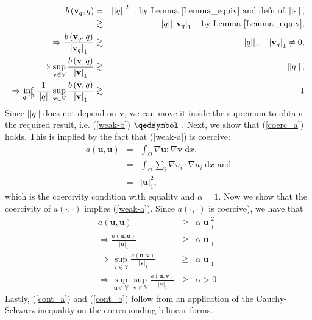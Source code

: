 \documentclass[12pt,a4paper]{article}
\theoremstyle{definition}
\begin{document}
\begin{eqnarray}
b\left(\textbf{v}_q,q\right) &=& \left|\left|q\right|\right|^2 \quad\text{by Lemma \ref{Lemma_equiv}  and defn of } \left|\left|\cdot\right|\right|,\\
&\gtrsim& \left|\left|q\right|\right| \left|\textbf{v}_q\right|_1\quad \text{by Lemma \ref{Lemma_equiv}},\\
\Rightarrow\frac{b\left(\textbf{v}_q,q\right)}{\left|\textbf{v}_q\right|_1} &\gtrsim& \left|\left|q\right|\right|,\quad \left|\textbf{v}_q\right|_1\neq 0,\\
\Rightarrow \sup_{\textbf{v}\in \mathbb{V}}\frac{b\left(\textbf{v},q\right)}{\left|\textbf{v}\right|_1} &\gtrsim& \left|\left|q\right|\right|,\\
\Rightarrow \inf_{q\in \mathbb{P}}\frac{1}{\left|\left|q\right|\right|}\sup_{\textbf{v}\in \mathbb{V}}\frac{b\left(\textbf{v},q\right)}{\left|\textbf{v}\right|_1} &\gtrsim& 1
\end{eqnarray}
Since $\left|\left|q\right|\right|$ does not depend on $\textbf{v}$, we can move it inside the supremum to obtain the required result, i.e. (\ref{weak-b}) $\qedsymbol$ .  Next, we show that (\ref{coerc_a}) holds.  This is implied by the fact that (\ref{weak-a}) is coercive:
\begin{eqnarray}
		a\left(\textbf{u},\textbf{u}\right)&=&\int_{\Omega}\nabla \textbf{u} : \nabla \textbf{v}\;\mathrm{d}x,\nonumber\\
		&=&\int_{\Omega}\sum_{i}\nabla u_i \cdot \nabla u_i\;\mathrm{d}x\text{ and}\nonumber\\
		&=&\left|\textbf{u}\right|_1^2,\nonumber
\end{eqnarray}
which is the coercivity condition with equality and $\alpha = 1$.  Now we show that  the coercivity of $a\left(\cdot,\cdot\right)$ implies (\ref{weak-a}).  Since $a\left(\cdot,\cdot\right)$ is coercive), we have that
\begin{eqnarray}
a\left(\textbf{u},\textbf{u}\right)&\geq& \alpha  \left|\textbf{u}\right|_1^2 \nonumber \\
\Rightarrow \frac{a\left(\textbf{u},\textbf{u}\right)}{\left|\textbf{u}\right|_1}&\geq& \alpha \left|\textbf{u}\right|_1 \nonumber\\
\Rightarrow  \sup_{\textbf{v}\in \mathbb{V}}\frac{a\left(\textbf{u},\textbf{v}\right)}{\left|\textbf{v}\right|_1} &\geq& \alpha \left|\textbf{u}\right|_1\nonumber\\
\Rightarrow \sup_{\textbf{u}\in \mathbb{V}}\sup_{\textbf{v}\in \mathbb{V}}\frac{a\left(\textbf{u},\textbf{v}\right)}{\left|\textbf{v}\right|_1} &\geq& \alpha>0\nonumber.
\end{eqnarray}
Lastly, (\ref{cont_a}) and (\ref{cont_b}) follow from an application of the Cauchy-Schwarz inequality on the corresponding bilinear forms.
\end{document}
